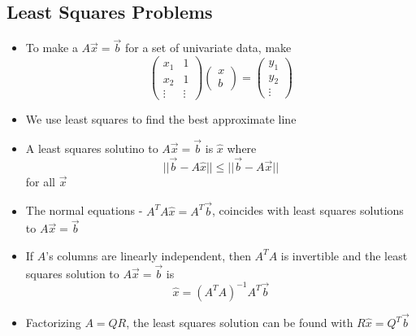 \documentclass{article}
\begin{document}
\subsection{Least Squares Problems}
\begin{itemize}
    \item  To make a \(A\vec{x}=\vec{b}\) for a set of univariate data, make 
    \[\begin{pmatrix} x_1&1\\x_2&1\\\vdots&\vdots \end{pmatrix}\begin{pmatrix} x\\b \end{pmatrix} = \begin{pmatrix} y_1\\y_2\\\vdots \end{pmatrix}\]
    \item We use least squares to find the best approximate line 
    \item A least squares solutino to \(A\vec{x}=\vec{b}\) is \(\hat{x}\) where 
    \[||\vec{b}-A\hat{x}||\leq||\vec{b}-A\vec{x}||\] for all \(\vec{x}\)
    \item The normal equations - \(A^TA\hat{x}=A^T\vec{b}\), coincides with least squares solutions to \(A\vec{x}=\vec{b}\)
    \item If \(A\)'s columns are linearly independent, then \(A^TA\) is invertible and the least squares solution to \(A\vec{x}=\vec{b}\) is \[\hat{x}=(A^TA)^{-1}A^T\vec{b}\]
    \item Factorizing \(A=QR\), the least squares solution can be found with \(R\hat{x}=Q^T\vec{b}\)
\end{itemize}
\end{document}
